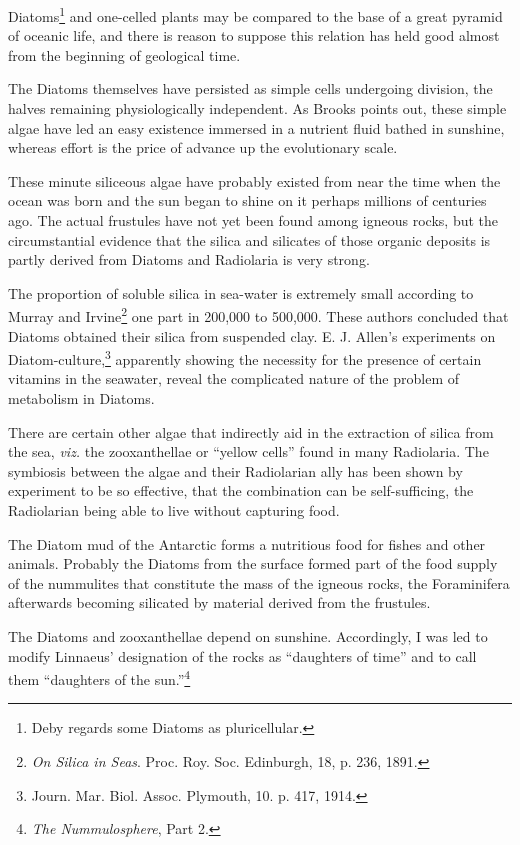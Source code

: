 \documentclass[a4paper, 12pt, oneside]{article}
\begin{document}
Diatoms\footnote{Deby regards some Diatoms as pluricellular.} and one-celled plants may be compared to the base of a great pyramid of oceanic life, and there is reason to suppose this relation has held good almost from the beginning of geological time.

The Diatoms themselves have persisted as simple cells undergoing division, the halves remaining physiologically independent. As Brooks points out, these simple algae have led an easy existence immersed in a nutrient fluid bathed in sunshine, whereas effort is the price of advance up the evolutionary scale.

These minute siliceous algae have probably existed from near the time when the ocean was born and the sun began to shine on it perhaps millions of centuries ago. The actual frustules have not yet been found among igneous rocks, but the circumstantial evidence that the silica and silicates of those organic deposits is partly derived from Diatoms and Radiolaria is very strong.

The proportion of soluble silica in sea-water is extremely small according to Murray and Irvine\footnote{\emph{On Silica in Seas}. Proc. Roy. Soc. Edinburgh, 18, p. 236, 1891.} one part in 200,000 to 500,000. These authors concluded that Diatoms obtained their silica from suspended clay. E. J. Allen's experiments on Diatom-culture,\footnote{Journ. Mar. Biol. Assoc. Plymouth, 10. p. 417, 1914.} apparently showing the necessity for the presence of certain vitamins in the seawater, reveal the complicated nature of the problem of metabolism in Diatoms.

There are certain other algae that indirectly aid in the extraction of silica from the sea, \emph{viz.} the zooxanthellae or ``yellow cells'' found in many Radiolaria. The symbiosis between the algae and their Radiolarian ally has been shown by experiment to be so effective, that the combination can be self-sufficing, the Radiolarian being able to live without capturing food.

The Diatom mud of the Antarctic forms a nutritious food for fishes and other animals. Probably the Diatoms from the surface formed part of the food supply of the nummulites that constitute the mass of the igneous rocks, the Foraminifera afterwards becoming silicated by material derived from the frustules.

The Diatoms and zooxanthellae depend on sunshine. Accordingly, I was led to modify Linnaeus' designation of the rocks as ``daughters of time'' and to call them ``daughters of the sun.''\footnote{\emph{The Nummulosphere}, Part 2.}
\end{document}
